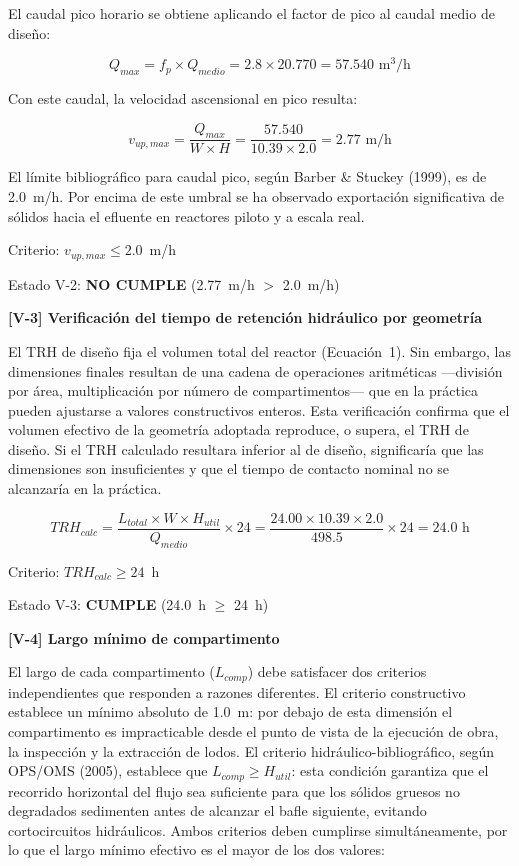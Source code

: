 \documentclass[12pt,a4paper]{article}
\begin{document}
El caudal pico horario se obtiene aplicando el factor de pico al caudal medio de diseño:

\begin{equation}
Q_{max} = f_p \times Q_{medio} = 2.8 \times 20.770 = 57.540 \text{ m}^3\text{/h}
\end{equation}

Con este caudal, la velocidad ascensional en pico resulta:

\begin{equation}
v_{up,max} = \frac{Q_{max}}{W \times H} = \frac{57.540}{10.39 \times 2.0} = 2.77 \text{ m/h}
\end{equation}

El límite bibliográfico para caudal pico, según Barber \& Stuckey (1999), es de 2.0~m/h. Por encima de este umbral se ha observado exportación significativa de sólidos hacia el efluente en reactores piloto y a escala real.

Criterio: $v_{up,max} \leq 2.0$~m/h

Estado V-2: \textbf{NO CUMPLE} (2.77~m/h $>$ 2.0~m/h)

\textbf{[V-3] Verificación del tiempo de retención hidráulico por geometría}

El TRH de diseño fija el volumen total del reactor (Ecuación~1). Sin embargo, las dimensiones finales resultan de una cadena de operaciones aritméticas ---división por área, multiplicación por número de compartimentos--- que en la práctica pueden ajustarse a valores constructivos enteros. Esta verificación confirma que el volumen efectivo de la geometría adoptada reproduce, o supera, el TRH de diseño. Si el TRH calculado resultara inferior al de diseño, significaría que las dimensiones son insuficientes y que el tiempo de contacto nominal no se alcanzaría en la práctica.

\begin{equation}
TRH_{calc} = \frac{L_{total} \times W \times H_{util}}{Q_{medio}} \times 24 = \frac{24.00 \times 10.39 \times 2.0}{498.5} \times 24 = 24.0 \text{ h}
\end{equation}

Criterio: $TRH_{calc} \geq 24$~h

Estado V-3: \textbf{CUMPLE} (24.0~h $\geq$ 24~h)

\textbf{[V-4] Largo mínimo de compartimento}

El largo de cada compartimento ($L_{comp}$) debe satisfacer dos criterios independientes que responden a razones diferentes. El criterio constructivo establece un mínimo absoluto de 1.0~m: por debajo de esta dimensión el compartimento es impracticable desde el punto de vista de la ejecución de obra, la inspección y la extracción de lodos. El criterio hidráulico-bibliográfico, según OPS/OMS (2005), establece que $L_{comp} \geq H_{util}$: esta condición garantiza que el recorrido horizontal del flujo sea suficiente para que los sólidos gruesos no degradados sedimenten antes de alcanzar el bafle siguiente, evitando cortocircuitos hidráulicos. Ambos criterios deben cumplirse simultáneamente, por lo que el largo mínimo efectivo es el mayor de los dos valores:
\end{document}
